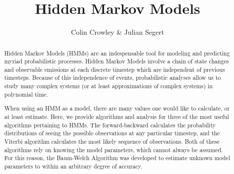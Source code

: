 \documentclass[11pt]{article}
\title{Hidden Markov Models}
\author{Colin Crowley \& Julian Segert}
\date{}
\begin{document}
\maketitle

\begin{abstract}
Hidden Markov Models (HMMs) are an indespensable tool for modeling and predicting myriad probabilistic processes. Hidden Markov Models involve a chain of state changes and observable emissions at each discrete timestep which are independent of previous timesteps. Because of this independence of events, probabilistic analyses allow us to study many complex systems (or at least approximations of complex systems) in polynomial time.

When using an HMM as a model, there are many values one would like to calculate, or at least estimate. Here, we provide algorithms and analysis for three of the most useful algorithms pertaining to HMMs. The forward-backward calculates the probability distributions of seeing the possible observations at any particular timestep, and the Viterbi algorithm calculates the most likely sequence of observations. Both of these algorithms rely on knowing the model parameters, which cannot always be assumed. For this reason, the Baum-Welch Algorithm was developed to estimate unknown model parameters to within an arbitrary degree of accuracy.
\end{abstract}




%
%
%




\appendix
%
%
\end{document}
